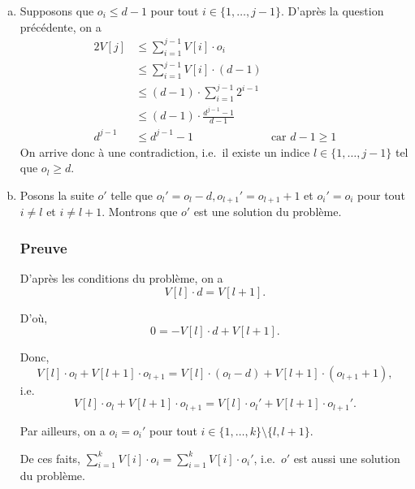 \documentclass[12pt,a4paper]{article}
\begin{document}
\begin{enumerate}[a)]
 En utilisant le r\'esultat de la question pr\'ec\'edente, il en r\'esulte que
 \begin{equation*}
    V[j]\cdot g_j \leq \displaystyle\sum_{i=1}^{j} V[i]\cdot o_i. 
 \end{equation*}
 
 D'o\`u, 
 \begin{equation*}
    V[j]\cdot (g_j - o_j) \leq \displaystyle\sum_{i=1}^{j-1} V[i]\cdot o_i. 
 \end{equation*}
 Or $g_j - o_j \geq 1$ d'apr\`es la question a) et le fait que ce sont des entiers naturels.
 Donc, \( V[j] \leq \displaystyle\sum_{i=1}^{j-1} V[i]\cdot o_i\).
 
 \item Supposons que $o_i \leq d-1$ pour tout $i \in \{1,\dotsc,j-1\}$. D'apr\`es la question pr\'ec\'edente, on a 
 \begin{alignat*}{2}
 	V[j] &\leq \displaystyle\sum_{i=1}^{j-1} V[i]\cdot o_i \\
 		 &\leq \displaystyle\sum_{i=1}^{j-1} V[i]\cdot (d-1) \\
 		 &\leq (d-1)\cdot \displaystyle\sum_{i=1}^{j-1} 2^{i-1} \\
 		 &\leq (d-1)\cdot \frac{d^{j-1}-1}{d-1} \\
 	d^{j-1}	 &\leq d^{j-1}-1 & \text{car } d-1 \geq 1
 \end{alignat*}
 On arrive donc \`a une contradiction, i.e.\ il existe un indice \(l \in \{1,\dotsc,j-1\}\) tel que $o_l \geq d$.
 
 \item Posons la suite $o'$ telle que $o_{l}' = o_l-d, o_{l+1}' = o_{l+1}+1$ et $o_i' = o_i$ pour tout $i \neq l$ et $i \neq l+1$. Montrons que $o'$ est une solution du probl\`eme.
 
 \subsubsection*{Preuve}
 D'apr\`es les conditions du probl\`eme, on a
 \begin{equation*}
    V[l]\cdot d = V[l+1].
 \end{equation*}
 
 D'o\`u, 
 \begin{equation*}
    0 = -V[l]\cdot d + V[l+1].
 \end{equation*}
 
 Donc, 
 \begin{equation*}
    V[l]\cdot o_l + V[l+1]\cdot o_{l+1} = V[l]\cdot (o_l-d) + V[l+1]\cdot (o_{l+1} + 1),
 \end{equation*}
 i.e.\ 
 \begin{equation*}
    V[l]\cdot o_l + V[l+1]\cdot o_{l+1} = V[l]\cdot o_l' + V[l+1]\cdot o_{l+1}'.
 \end{equation*}
  
  Par ailleurs, on a $o_i = o_i' $ pour tout $i \in \{1, \dotsc, k\}\setminus \{ l,l+1 \}$. 
  
  De ces faits, \( \displaystyle\sum_{i=1}^{k} V[i]\cdot o_i = \displaystyle\sum_{i=1}^{k} V[i]\cdot o_i'\), i.e.\ $o'$ est aussi une solution du probl\`eme. 
\end{enumerate}
\end{document}
